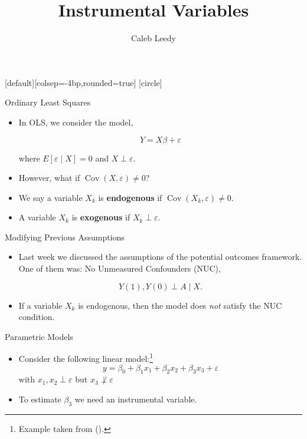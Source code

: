 \documentclass[handout]{beamer} %
\author[CL]{Caleb Leedy}
\title[IV]{Instrumental Variables}
\DeclareMathOperator*{\Cov}{Cov}
\begin{document}
\everymath{\displaystyle}
[default][colsep=-4bp,rounded=true]
[circle]
\frame{\titlepage}

\begin{frame}{Ordinary Least Squares}

\begin{itemize}
    \item<1-> In OLS, we consider the model,

      \begin{equation}\label{eq:ols}
      Y = X\beta + \varepsilon
      \end{equation}

      where $E[\varepsilon \mid X] = 0$ and $X \perp \varepsilon$.
    \item<2-> However, what if $\Cov(X, \varepsilon) \neq 0$?
    \item<3-> We say a variable $X_k$ is \textbf{endogenous} if $\Cov(X_k,
      \varepsilon) \neq 0$.
    \item<3-> A variable $X_k$ is \textbf{exogenous} if $X_k \perp \varepsilon$.
\end{itemize}

\end{frame}

\begin{frame}{Modifying Previous Assumptions}

\begin{itemize}
    \item Last week we discussed the assumptions of the potential outcomes
      framework. One of them was: No Unmeasured Confounders (NUC),

      \[Y(1), Y(0) \perp A \mid X.\]

    \item If a variable $X_k$ is endogenous, then the model does \textit{not} 
      satisfy the NUC condition.
\end{itemize}

\end{frame}

\begin{frame}{Parametric Models}

\begin{itemize}
  \item Consider the following linear model:\footnote{Example taken from
    (\cite{wooldridge2010econometric}).}
      \[y = \beta_0 + \beta_1 x_1 + \beta_2 x_2 + \beta_3 x_3 + \varepsilon\]
      with $x_1, x_2 \perp \varepsilon$ but $x_3 \not\perp \varepsilon$
    \item To estimate $\beta_3$ we need an instrumental variable.
\end{itemize}

\end{frame}
\end{document}
